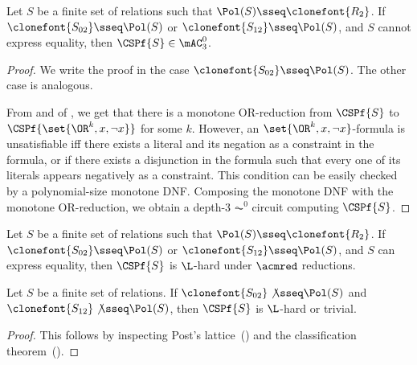 \documentclass[11pt]{article}
\begin{document}
\begin{lemma}
    \label{lem:ac0-cspsat}
    Let $S$ be a finite set of relations
    such that $\Pol(S) \sseq \clonefont{R_2}$.
    If $\clonefont{S_{02}} \sseq \Pol(S)$
    or
    $\clonefont{S_{12}} \sseq \Pol(S)$,
    and $S$ cannot express equality,
    then
    $\CSPf{S} \in 
    \mAC^0_3$.
\end{lemma}
\begin{proof}
    We write the proof in the case
    $\clonefont{S_{02}} \sseq \Pol(S)$.
    The other case is analogous.

    From  and
     of ,
    we get that
    there is a monotone OR-reduction
    from
    $\CSPf{S}$ to
    $\CSPf{\set{\OR^k, x, \neg x}}$ for some $k$.
    However, an $\set{\OR^k, x, \neg x}$-formula
    is unsatisfiable iff
    there exists a literal and its negation as a constraint in the formula,
    or if there exists a disjunction
    in the formula
    such that
    every one of its literals appears negatively as a constraint.
    This condition can be easily checked by a polynomial-size
    monotone DNF.
    Composing the monotone DNF with the monotone OR-reduction,
    we obtain a depth-3 $\AC^0$ circuit computing
    $\CSPf{S}$.
\end{proof}

\begin{lemma}
    \label{lem:equality-lhard}
    Let $S$ be a finite set of relations
    such that $\Pol(S) \sseq \clonefont{R_2}$.
    If 
    $\clonefont{S_{02}} \sseq \Pol(S)$
    or
    $\clonefont{S_{12}} \sseq \Pol(S)$,
    and $S$ can express equality,
    then
    $\CSPf{S}$ is $\L$-hard
    under $\acmred$ reductions.
\end{lemma}



\begin{lemma}
    \label{lem:everything-lhard}
    Let $S$ be a finite set of relations.
    If 
    $\clonefont{S_{02}} \not\sseq \Pol(S)$
    and
    $\clonefont{S_{12}} \not \sseq \Pol(S)$,
    then
    $\CSPf{S}$ is $\L$-hard or trivial.
\end{lemma}
\begin{proof}
    This
    follows by 
    inspecting
    Post's 
    lattice~()
    and the classification theorem~().
\end{proof}
\end{document}
